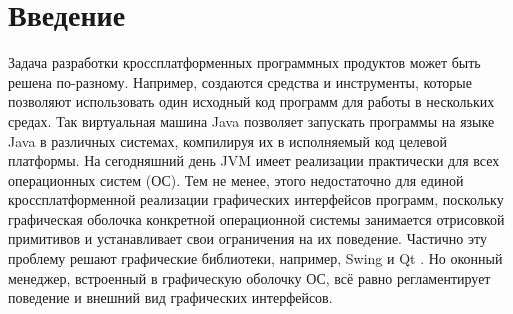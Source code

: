 \documentclass[14pt]{matmex-diploma}
\begin{document}
\maketitle
\tableofcontents
\section*{Введение}
Задача разработки кроссплатформенных программных продуктов может быть решена по-разному. Например, создаются средства и инструменты, которые позволяют использовать один исходный код программ для работы в нескольких средах. Так виртуальная машина Java позволяет запускать программы на языке Java в различных системах, компилируя их в исполняемый код целевой платформы. На сегодняшний день JVM имеет реализации практически для всех операционных систем (ОС). Тем не менее, этого недостаточно для единой кроссплатформенной реализации графических интерфейсов программ, поскольку графическая оболочка конкретной операционной системы занимается отрисовкой примитивов и устанавливает свои ограничения на их поведение. Частично эту проблему решают графические библиотеки, например, Swing \cite{wiki:swing} и Qt \cite{wiki:qt}. Но оконный менеджер, встроенный в графическую оболочку ОС, всё равно регламентирует поведение и внешний вид графических интерфейсов.
\end{document}

